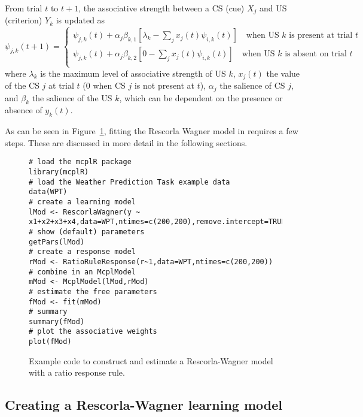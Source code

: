 \documentclass[doc]{apa}
\renewcommand{\vec}[1]{\text{\bf{#1}}}
\newcommand{\code}[1]{{\ttfamily{#1}}}
\begin{document}
From trial $t$ to $t+1$, the associative strength between a CS (cue) $X_j$ and US (criterion) $Y_k$ is updated as
\begin{equation}
\psi_{j,k}(t+1) = \begin{cases} \psi_{j,k}(t) + \alpha_j \beta_{k,1} [\lambda_k - \sum_j x_j(t) \psi_{i,k}(t)] \quad \text{when US $k$ is present at trial $t$} \\
\psi_{j,k}(t) + \alpha_j \beta_{k,2} [0 - \sum_j x_j(t) \psi_{i,k}(t)] \quad \text{when US $k$ is absent on trial $t$} \\
\end{cases}
\end{equation}
where $\lambda_k$ is the maximum level of associative strength of US $k$, $x_j(t)$ the value of the CS $j$ at trial $t$ (0 when CS $j$ is not present at $t$), $\alpha_j$ the salience of CS $j$, and $\beta_k$ the salience of the US $k$, which can be dependent on the presence or absence of $y_k(t)$.


As can be seen in Figure~\ref{fig:R-W}, fitting the Rescorla Wagner model in \code{mcplR} requires a few steps. These are discussed in more detail in the following sections.


\begin{figure}
\begin{verbatim}
# load the mcplR package
library(mcplR)
# load the Weather Prediction Task example data
data(WPT)
# create a learning model
lMod <- RescorlaWagner(y ~ x1+x2+x3+x4,data=WPT,ntimes=c(200,200),remove.intercept=TRUE)
# show (default) parameters
getPars(lMod)
# create a response model
rMod <- RatioRuleResponse(r~1,data=WPT,ntimes=c(200,200))
# combine in an McplModel
mMod <- McplModel(lMod,rMod)
# estimate the free parameters
fMod <- fit(mMod)
# summary
summary(fMod)
# plot the associative weights
plot(fMod)
\end{verbatim}
\caption{Example code to construct and estimate a Rescorla-Wagner model with a ratio response rule.}
\label{fig:R-W} 
\end{figure}

\subsection{Creating a Rescorla-Wagner learning model}
\end{document}
